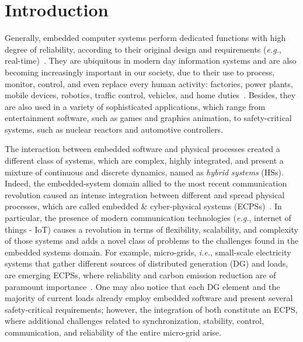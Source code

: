 \documentclass[format=acmsmall, review=false, screen=true]{acmart}
\begin{document}


\maketitle

\section{Introduction}

Generally, embedded computer systems perform dedicated functions with high degree of reliability, according to their original design and requirements ({\it e.g.}, real-time)~\cite{Kopetz11}. They are ubiquitous in modern day information systems and are also becoming increasingly important in our society, due to their use to process, monitor, control, and even replace every human activity: factories, power plants, mobile devices, robotics, traffic control, vehicles, and home duties~\cite{xu15}. Besides, they are also used in a variety of sophisticated applications, which range from entertainment software, such as games and graphics animation, to safety-critical systems, such as nuclear reactors and automotive controllers. 

The interaction between embedded software and physical processes created a different class of systems, which are complex, highly integrated, and present a mixture of continuous and discrete dynamics, named as \textit{hybrid systems} (HSs). Indeed, the embedded-system domain allied to the most recent communication revolution caused an intense integration between different and spread physical processes, which are called embedded \& cyber-physical systems (ECPSs)~\cite{leeCPS}. In particular, the presence of modern communication technologies ({\it e.g.}, internet of things - IoT) causes a revolution in terms of flexibility, scalability, and complexity of those systems and adds a novel class of problems to the challenges found in the embedded systems domain. For example, micro-grids, {\it i.e.}, small-scale electricity systems that gather different sources of distributed generation (DG) and loads, are emerging ECPSs, where reliability and carbon emission reduction are of paramount importance~\cite{xu15}. One may also notice that each DG element and the majority of current loads already employ embedded software and present several safety-critical requirements; however, the integration of both constitute an ECPS, where additional challenges related to synchronization, stability, control, communication, and reliability of the entire micro-grid arise.
\end{document}
